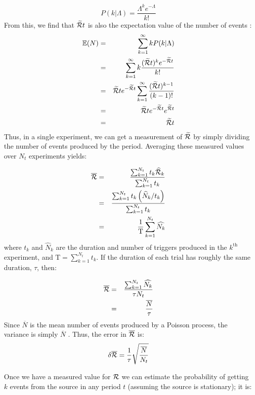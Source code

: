 \begin{equation}
\label{eqn:poisson}
P(k|\Lambda) = \frac{\Lambda^k e^{-\Lambda}}{k!}
\end{equation}
From this, we find that $\widetilde{\mathcal{R}} t$ is also the expectation value of the number of events \cite{Taylor:ErrorAnalysis:2E}:
\begin{eqnarray}
\mathbb{E}(N) & = & \sum_{k=1}^{\infty} k P(k|\Lambda) \nonumber \\
 & = & \sum_{k=1}^{\infty} k \frac{(\widetilde{\mathcal{R}} t)^k e^{-\widetilde{\mathcal{R}} t}}{k!} \nonumber \\
 & = & \widetilde{\mathcal{R}} t e^{-\widetilde{\mathcal{R}} t} \sum_{k=1}^{\infty} \frac{(\widetilde{\mathcal{R}} t)^{k-1}}{(k-1)!} \nonumber \\
 & = & \widetilde{\mathcal{R}} t e^{-\widetilde{\mathcal{R}} t} e^{\widetilde{\mathcal{R}} t} \nonumber \\
 & = & \widetilde{\mathcal{R}} t
\end{eqnarray}
Thus, in a single experiment, we can get a measurement of $\widetilde{\mathcal{R}}$ by simply dividing the number of events produced by the period. Averaging these measured values over $N_t$ experiments yields:

\begin{eqnarray}
\label{eqn:avg_rate_param}
\overline{\RP} & = & \frac{\sum_{k=1}^{N_t} t_k \widehat{\RP}_k}{\sum_{k=1}^{N_t} t_k} \nonumber \\
 & = & \frac{\sum_{k=1}^{N_t} t_k \left(\widehat{N}_k/t_k\right)}{\sum_{k=1}^{N_t} t_k} \nonumber \\
 & = & \frac{1}{\mathrm{T}}\sum_{k=1}^{N_t} \widehat{N_k}
 \end{eqnarray}
where $t_k$ and $\widehat{N}_k$ are the duration and number of triggers produced in the $k^{\mathrm{th}}$ experiment, and $\mathrm{T} = \sum_{k=1}^{N_t} t_k$. If the duration of each trial has roughly the same duration, $\tau$, then:

\begin{eqnarray}
\overline{\mathcal{R}} & = & \frac{\sum_{k=1}^{N_t} \widehat{N_k}}{\tau N_t} \\
 & = & \frac{\overline{N}}{\tau}
 \end{eqnarray}
Since $\overline{N}$ is the mean number of events produced by a Poisson process, the variance is simply $\overline{N}$ \cite{Taylor:ErrorAnalysis:2E}. Thus, the error in $\overline{\mathcal{R}}$ is:
\begin{equation}
\label{eqn:err_R}
\delta \overline{\RP} = \frac{1}{\tau}\sqrt{\frac{\overline{N}}{N_t}}
\end{equation}

Once we have a measured value for $\mathcal{R}$ we can estimate the probability of getting $k$ events from the source in any period $t$ (assuming the source is stationary); it is:

